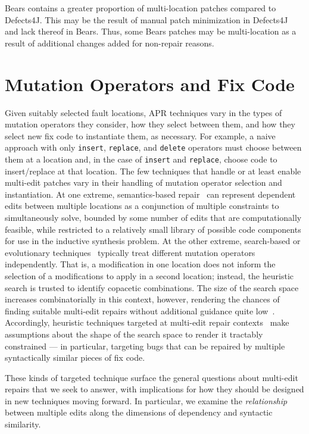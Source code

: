 \documentclass[sigconf, timestamp-false, anonymous=true]{acmart}
\begin{document}
Bears contains a greater proportion of 
multi-location patches compared to Defects4J. This may be the 
result of manual patch minimization in Defects4J~\cite{defects4j} 
and lack thereof in Bears.
Thus, some Bears patches may be multi-location as a result of additional 
changes added for non-repair reasons.






\section{Mutation Operators and Fix Code}
\label{sec:mutops}

Given suitably selected fault locations, APR techniques vary in the types of
mutation operators they consider, how they select between them, and how they
select new fix code to instantiate them, as necessary.  For example, a naive
approach with only \texttt{insert}, \texttt{replace}, and \texttt{delete}
operators must choose between them at a location and, in the case of
\texttt{insert} and \texttt{replace}, choose code to insert/replace at that
location.  
%
The few techniques that handle or at least enable multi-edit patches vary in their
handling of mutation operator selection and instantiation.  At one
extreme, semantics-based repair~\cite{s3,angelix} can represent dependent edits between multiple
locations as a conjunction of multiple constraints to simultaneously solve,
bounded by some number of edits that are computationally feasible, while
restricted to a relatively small library of possible code components for use in
the inductive synthesis problem.    At the other extreme, search-based or
evolutionary techniques~\cite{genprog,others} typically treat different mutation
operators independently.  That is, a modification in one location does not
inform the selection of a modifications to apply in a second location; instead,
the heuristic search is trusted to identify copacetic combinations.  The size of
the search space increases combinatorially in this context, however, rendering
the chances of finding suitable multi-edit repairs without additional guidance
quite low~\cite{ae,long2016}. Accordingly, heuristic techniques targeted at multi-edit
repair contexts~\cite{hercules,maybewang2018} make assumptions about the
shape of the search space to render it tractably constrained --- in particular,
targeting bugs that can be repaired by multiple syntactically similar pieces of
fix code.

These kinds of targeted technique surface the general questions about
multi-edit repairs that we seek to answer, with
implications for how they should be designed in new techniques moving forward.
In particular, we examine the \emph{relationship} between multiple edits 
along the dimensions of dependency and syntactic similarity.
\end{document}
